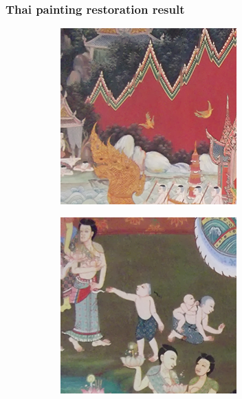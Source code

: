 \documentclass[xcolor=dvipsnames, xetex,serif]{beamer}
\begin{document}
    \begin{frame}
        \frametitle{Thai painting restoration result}
        \begin{figure}[H]
            \centering
            \begin{subfigure}{0.15\linewidth}
                \centering
                \includegraphics[width=0.9\linewidth]{images/result_ex4/splitbergman_case01.png}
            \end{subfigure}
            \begin{subfigure}{0.15\linewidth}
                \centering
                \includegraphics[width=0.9\linewidth]{images/result_ex4/splitbergman_case02.png}

\end{subfigure}
\end{figure}
\end{frame}
\end{document}
